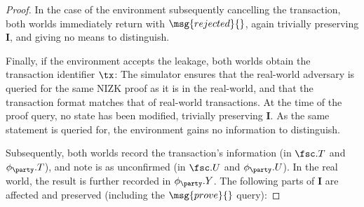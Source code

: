 \begin{proof}
In the case of the environment subsequently cancelling the transaction, both
worlds immediately return with $\msg{rejected}{}$, again trivially preserving
$\boldsymbol I$, and giving no means to distinguish.

Finally, if the environment accepts the leakage, both worlds obtain the
transaction identifier $\tx$: The simulator ensures that the real-world
adversary is queried for the same NIZK proof as it is in the real-world, and
that the transaction format matches that of real-world transactions. At the time
of the proof query, no state has been modified, trivially preserving
$\boldsymbol I$. As the same statement is queried for, the environment gains no
information to distinguish.

Subsequently, both worlds record the transaction's information (in $\fsc.T$ and
$\phi_\party.T$), and note is as unconfirmed (in $\fsc.U$ and $\phi_\party.U$).
In the real world, the result is further recorded in $\phi_\party.Y$. The
following parts of $\boldsymbol I$ are affected and preserved (including the
$\msg{prove}{}$ query):


\end{proof}
